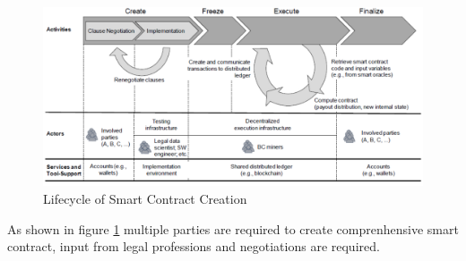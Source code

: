 \documentclass[12pt,tightenlines,letterpaper]{scrartcl}
\begin{document}
\begin{figure}
\centering
\includegraphics[width=1\linewidth]{smartContractCreation}
\caption{Lifecycle of Smart Contract Creation \cite{Sillaber2017}}
\label{fig:smartcontractcreation}
\end{figure}

As shown in figure \ref{fig:smartcontractcreation} multiple parties are required to create comprenhensive smart contract, input from legal professions and negotiations are required.

\newpage 

\newpage


\renewcommand\bibname{References} %

\newpage 
 \printbibliography
 
\linespread{1}
\end{document}
